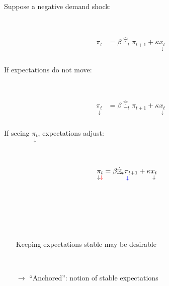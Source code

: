 \documentclass{beamer}
\DeclareMathOperator{\E}{\mathbb{E}}
\begin{document}
\begin{frame}
	\frametitle{}

Suppose a negative demand shock:

\

\begin{align*}
\pi_t & = \beta \hat{\E}_t\pi_{t+1} + \kappa \underset{\downarrow}{x_t} 
\end{align*}




\end{frame}

\begin{frame}
	\frametitle{}

If expectations do not move:

\

\begin{align*}
\underset{\downarrow}{\pi_t} & = \beta \hat{\E}_t\pi_{t+1}+ \kappa \underset{\downarrow}{x_t} 
\end{align*}




\end{frame}

\begin{frame}
	\frametitle{}

If seeing $\underset{\downarrow}{\pi_t}$, expectations adjust:

\

\begin{align*}
\underset{\downarrow \color{red}{\downarrow}}{\pi_t} & = \beta \underset{\color{blue}{\downarrow}}{\hat{\E}_t\pi_{t+1}}+ \kappa \underset{\downarrow}{x_t} 
\end{align*}

\

\

\

\begin{itemize}
\item[] Keeping expectations stable may be desirable

\

\item[$\rightarrow$]  ``Anchored'': notion of stable expectations
\end{itemize}

\


\end{frame}
\end{document}
